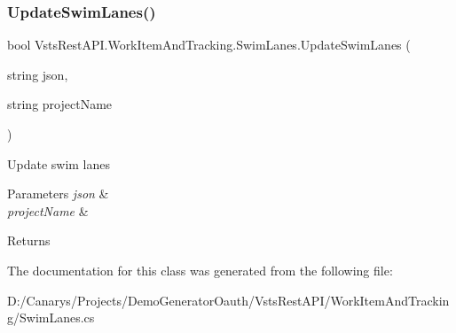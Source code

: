 \subsubsection{\texorpdfstring{Update\+Swim\+Lanes()}{UpdateSwimLanes()}}
{\footnotesize\ttfamily bool Vsts\+Rest\+A\+P\+I.\+Work\+Item\+And\+Tracking.\+Swim\+Lanes.\+Update\+Swim\+Lanes (\begin{DoxyParamCaption}\item[{string}]{json,  }\item[{string}]{project\+Name }\end{DoxyParamCaption})}



Update swim lanes 


\begin{DoxyParams}{Parameters}
{\em json} & \\
\hline
{\em project\+Name} & \\
\hline
\end{DoxyParams}
\begin{DoxyReturn}{Returns}

\end{DoxyReturn}


The documentation for this class was generated from the following file\+:\begin{DoxyCompactItemize}
\item 
D\+:/\+Canarys/\+Projects/\+Demo\+Generator\+Oauth/\+Vsts\+Rest\+A\+P\+I/\+Work\+Item\+And\+Tracking/Swim\+Lanes.\+cs\end{DoxyCompactItemize}
